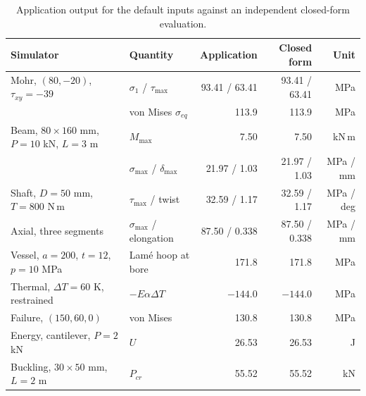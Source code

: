 \begin{table}[ht]\centering\small
\caption{Application output for the default inputs against an independent closed-form evaluation.}\label{tab:defaults}
\setlength{\tabcolsep}{4pt}\begin{tabular}{@{}llrrr@{}}\toprule
Simulator & Quantity & Application & Closed form & Unit\\\midrule
Mohr, $(80,-20)$, $\tau_{xy}=-39$ & $\sigma_1$ / $\tau_{\max}$ & 93.41 / 63.41 & 93.41 / 63.41 & MPa\\
 & von Mises $\sigma_{eq}$ & 113.9 & 113.9 & MPa\\
Beam, $80\times160$ mm, $P=10$ kN, $L=3$ m & $M_{\max}$ & 7.50 & 7.50 & kN\,m\\
 & $\sigma_{\max}$ / $\delta_{\max}$ & 21.97 / 1.03 & 21.97 / 1.03 & MPa / mm\\
Shaft, $D=50$ mm, $T=800$ N\,m & $\tau_{\max}$ / twist & 32.59 / 1.17 & 32.59 / 1.17 & MPa / deg\\
Axial, three segments & $\sigma_{\max}$ / elongation & 87.50 / 0.338 & 87.50 / 0.338 & MPa / mm\\
Vessel, $a=200$, $t=12$, $p=10$ MPa & Lam\'e hoop at bore & 171.8 & 171.8 & MPa\\
Thermal, $\Delta T=60$ K, restrained & $-E\alpha\Delta T$ & $-144.0$ & $-144.0$ & MPa\\
Failure, $(150,60,0)$ & von Mises & 130.8 & 130.8 & MPa\\
Energy, cantilever, $P=2$ kN & $U$ & 26.53 & 26.53 & J\\
Buckling, $30\times50$ mm, $L=2$ m & $P_{cr}$ & 55.52 & 55.52 & kN\\\bottomrule
\end{tabular}
\end{table}

